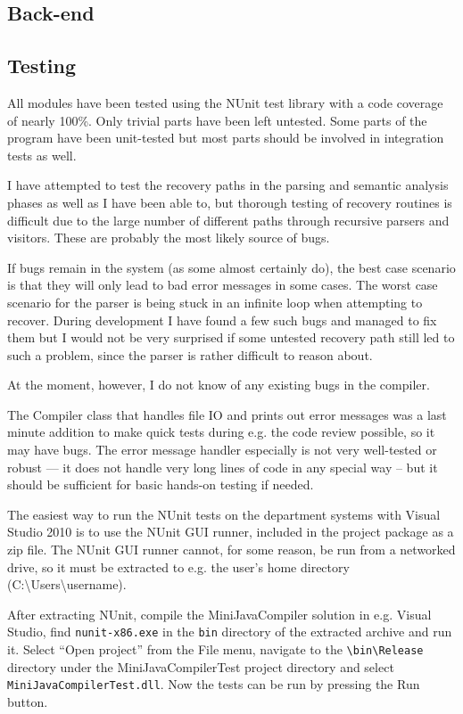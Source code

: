 \documentclass[a4paper,11pt]{article}
\begin{document}
\subsection{Back-end}

\subsection{Testing}

All modules have been tested using the NUnit test library with a code coverage of nearly 100\%. Only trivial parts have been left untested. Some parts of the program have been unit-tested but most parts should be involved in integration tests as well.

I have attempted to test the recovery paths in the parsing and semantic analysis phases as well as I have been able to, but thorough testing of recovery routines is difficult due to the large number of different paths through recursive parsers and visitors. These are probably the most likely source of bugs.

If bugs remain in the system (as some almost certainly do), the best case scenario is that they will only lead to bad error messages in some cases. The worst case scenario for the parser is being stuck in an infinite loop when attempting to recover. During development I have found a few such bugs and managed to fix them but I would not be very surprised if some untested recovery path still led to such a problem, since the parser is rather difficult to reason about.

At the moment, however, I do not know of any existing bugs in the compiler.

The Compiler class that handles file IO and prints out error messages was a last minute addition to make quick tests during e.g. the code review possible, so it may have bugs. The error message handler especially is not very well-tested or robust --- it does not handle very long lines of code in any special way -- but it should be sufficient for basic hands-on testing if needed.

The easiest way to run the NUnit tests on the department systems with Visual Studio 2010 is to use the NUnit GUI runner, included in the project package as a zip file. The NUnit GUI runner cannot, for some reason, be run from a networked drive, so it must be extracted to e.g. the user's home directory (C:\textbackslash Users\textbackslash username).

After extracting NUnit, compile the MiniJavaCompiler solution in e.g. Visual Studio, find \verb,nunit-x86.exe, in the \verb,bin, directory of the extracted archive and run it. Select ``Open project'' from the File menu, navigate to the \verb,\bin\Release, directory under the MiniJavaCompilerTest project directory and select \verb,MiniJavaCompilerTest.dll,. Now the tests can be run by pressing the Run button.
\end{document}
